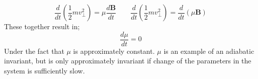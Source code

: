 \documentclass[14paper,11pt,hidelinks]{article}
\begin{document}
\begin{equation}
\frac{d}{dt}\left(\frac{1}{2}mv_\bot^2\right)=\mu\frac{d\mathbf{B}}{dt}
\qquad 
\frac{d}{dt}\left(\frac{1}{2}mv_\bot^2\right)=\frac{d}{dt}(\mu\mathbf{B})
\end{equation}
These together result in;
\begin{equation}
\frac{d\mu}{dt}=0
\end{equation}
Under the fact that \begin{math} \mu \end{math} is approximately constant. \begin{math} \mu \end{math} is an example of an adiabatic invariant, but is only approximately invariant if change of the parameters in the system is sufficiently slow. 



\end{document}
